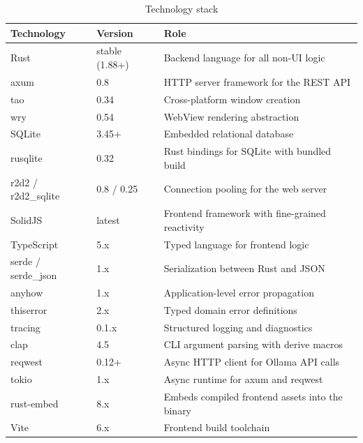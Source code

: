 \documentclass[a4paper, 11pt, oneside]{report}
\begin{document}
\begin{table}[H]
  \centering
  \caption{Technology stack}
  \label{tab:tech-stack}
  \begin{tabularx}{\textwidth}{l l X}
    \toprule
    \textbf{Technology} & \textbf{Version} & \textbf{Role} \\
    \midrule
    Rust                & stable (1.88+) & Backend language for all non-UI logic~\cite{rust_book} \\
    axum                & 0.8      & HTTP server framework for the REST API \\
    tao                 & 0.34     & Cross-platform window creation~\cite{tao} \\
    wry                 & 0.54     & WebView rendering abstraction~\cite{wry} \\
    SQLite              & 3.45+    & Embedded relational database~\cite{sqlite} \\
    rusqlite            & 0.32     & Rust bindings for SQLite with bundled build~\cite{rusqlite} \\
    r2d2 / r2d2\_sqlite & 0.8 / 0.25 & Connection pooling for the web server \\
    SolidJS             & latest   & Frontend framework with fine-grained reactivity \\
    TypeScript          & 5.x      & Typed language for frontend logic~\cite{typescript} \\
    serde / serde\_json & 1.x      & Serialization between Rust and JSON~\cite{serde} \\
    anyhow              & 1.x      & Application-level error propagation~\cite{anyhow} \\
    thiserror           & 2.x      & Typed domain error definitions~\cite{thiserror} \\
    tracing             & 0.1.x    & Structured logging and diagnostics~\cite{tracing} \\
    clap                & 4.5      & CLI argument parsing with derive macros \\
    reqwest             & 0.12+    & Async HTTP client for Ollama API calls~\cite{reqwest} \\
    tokio               & 1.x      & Async runtime for axum and reqwest \\
    rust-embed          & 8.x      & Embeds compiled frontend assets into the binary \\
    Vite                & 6.x      & Frontend build toolchain \\
    \bottomrule
  \end{tabularx}
\end{table}
\end{document}
